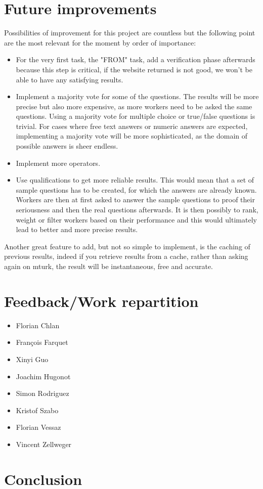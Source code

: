 \documentclass{article}
\begin{document}
\section{Future improvements} %
Possibilities of improvement for this project are countless but the following point are the most relevant for the moment by order of importance:
\begin{itemize}
\item For the very first task, the "FROM" task, add a verification phase afterwards because this step is critical, if the website returned is not good, we won't be able to have any satisfying results.
\item Implement a majority vote for some of the questions. The results will be more precise but also more expensive, as more workers need to be asked the same questions. Using a majority vote for multiple choice or true/false questions is trivial. For cases where free text answers or numeric answers are expected, implementing a majority vote will be more sophisticated, as the domain of possible answers is sheer endless.
\item Implement more operators.
\item Use qualifications to get more reliable results. This would mean that a set of sample questions has to be created, for which the answers are already known. Workers are then at first asked to answer the sample questions to proof their seriousness and then the real questions afterwards. It is then possibly to rank, weight or filter workers based on their performance and this would ultimately lead to better and more precise results.


\end{itemize}
Another great feature to add, but not so simple to implement, is the caching of previous results, indeed if you retrieve results from a cache, rather than asking again on mturk, the result will be instantaneous, free and accurate.
\section{Feedback/Work repartition} %
\begin{itemize}
\item Florian Chlan
\item François Farquet
\item Xinyi Guo
\item Joachim Hugonot
\item Simon Rodriguez
\item Kristof Szabo
\item Florian Vessaz
\item Vincent Zellweger
\end{itemize}
\section{Conclusion}
\end{document}
